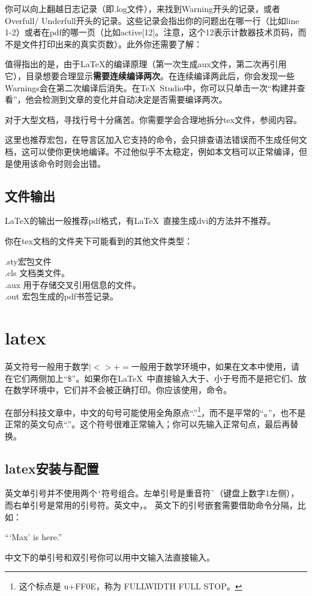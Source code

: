 	你可以向上翻越日志记录（即.log文件），来找到Warning开头的记录，或者Overfull/ Underfull开头的记录。这些记录会指出你的问题出在哪一行（比如line 1-2）或者在pdf的哪一页（比如active[12]。注意，这个12表示计数器技术页码，而不是文件打印出来的真实页数）。此外你还需要了解：
\begin{feai}
\item 值得指出的是，由于\LaTeX{}的编译原理（第一次生成aux文件，第二次再引用它），目录想要合理显示{\bfseries{需要连续编译两次}}。在连续编译两此后，你会发现一些Warnings会在第二次编译后消失。在\TeX\ Studio中，你可以只单击一次“构建并查看”，他会检测到文章的变化并自动决定是否需要编译两次。
\item 对于大型文档，寻找行号十分痛苦。你需要学会合理地拆分tex文件，参阅内容。%
\end{feai}

	这里也推荐宏包，在导言区加入它支持的命令，会只排查语法错误而不生成任何文档，这可以使你更快地编译。不过他似乎不太稳定，例如本文档可以正常编译，但是使用该命令时则会出错。
\subsection{文件输出}
	\LaTeX{}的输出一般推荐pdf格式，有\LaTeX\ 直接生成dvi的方法并不推荐。

你在tex文档的文件夹下可能看到的其他文件类型：
\begin{tabbing}
	.sty{\hspace{2em}}\=宏包文件\\%
	.cls	\> 文档类文件。\\
	.aux	\> 用于存储交叉引用信息的文件。\\
	.out	\> 宏包生成的pdf书签记录。
\end{tabbing}
\section{latex}
	英文符号一般用于数学$|<>+=$一般用于数学环境中，如果在文本中使用，请在它们两侧加上“\$”。如果你在\LaTeX\ 中直接输入大于、小于号而不是把它们、放在数学环境中，它们并不会被正确打印。你应该使用，命令。

	在部分科技文章中，中文的句号可能使用全角原点“.”\footnote{这个标点是 u+FF0E，称为 FULLWIDTH FULL STOP。}，而不是平常的“。”，也不是正常的英文句点“.”。这个符号很难正常输入；你可以先输入正常句点，最后再替换。
	\subsection{latex安装与配置}
	英文单引号并不使用两个\verb|'|符号组合。左单引号是重音符\verb|`|（键盘上数字1左侧），而右单引号是常用的引号符。英文中，{\color{cyan}{左双引号就是连续两个重音符号}}。
	英文下的引号嵌套需要借助命令分隔，比如：
\begin{codeshow}[listing side text, listing options={escapeinside=++}]%
``\thinspace`Max' is here.''
\end{codeshow}
中文下的单引号和双引号你可以用中文输入法直接输入。

